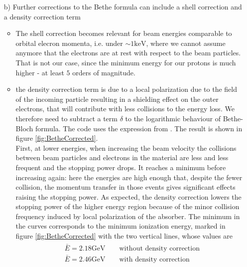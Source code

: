 \documentclass[10pt,a4paper]{article}
\begin{document}
\begin{enumerate}
\item[b)] Further corrections to the Bethe formula can include a shell correction and a density correction term
\begin{itemize}
\item The shell correction becomes relevant for beam energies comparable to orbital elecron momenta, i.e. under $\sim1\si{\kilo\electronvolt}$, where we cannot assume anymore that the electrons are at rest with respect to the beam particles. That is not our case, since the minimum energy for our protons is much higher - at least $5$ orders of magnitude.
\item the density correction term is due to a local polarization due to the field of the incoming particle resulting in a shielding effect on the outer electrons, that will contribute with less collisions to the energy loss.
We therefore need to subtract a term $\delta$ to the logarithmic behaviour of Bethe-Bloch formula. The code uses the expression from \cite{Leo}. The result is shown in figure \ref{fig:BetheCorrected}.\\
First, at lower energies, when increasing the beam velocity the collisions between beam particles and electrons in the material are less and less frequent and the stopping power drops. It reaches a minimum before increasing again: here the energies are high enough that, despite the fewer collision, the momentum transfer in those events gives significant effects raising the stopping power. As expected, the density correction lowers the stopping power of the higher energy region because of the minor collision frequency induced by local polarization of the absorber. The minimum in the curves corresponds to the minimum ionization energy, marked in figure \ref{fig:BetheCorrected} with the two vertical lines, whose values are
\begin{align*}
\begin{split}
&\bar{E} = 2.18 \si{\giga\electronvolt}\qquad \text{without density correction}\\
&\bar{E} = 2.46 \si{\giga\electronvolt}\qquad \text{with density correction}
\end{split}
\end{align*}


\end{itemize}
\end{enumerate}
\end{document}
